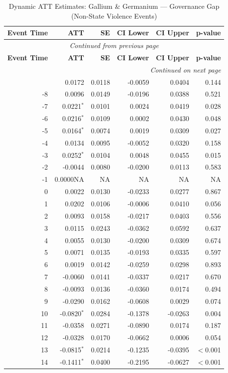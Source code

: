 \begin{longtable}{rrrrrr}
\caption{Dynamic ATT Estimates: Gallium \& Germanium --- Governance Gap (Non-State Violence Events)} \label{tab:gallium_germanium_non_state_violence_events} \\
\toprule
\textbf{Event Time} & \textbf{ATT} & \textbf{SE} & \textbf{CI Lower} & \textbf{CI Upper} & \textbf{p-value} \\
\midrule
\endfirsthead
\multicolumn{6}{c}{\textit{Continued from previous page}} \\
\toprule
\textbf{Event Time} & \textbf{ATT} & \textbf{SE} & \textbf{CI Lower} & \textbf{CI Upper} & \textbf{p-value} \\
\midrule
\endhead
\midrule \multicolumn{6}{r}{\textit{Continued on next page}} \\
\endfoot
\bottomrule
\endlastfoot
-9 & 0.0172 & 0.0118 & -0.0059 & 0.0404 & 0.144 \\
-8 & 0.0096 & 0.0149 & -0.0196 & 0.0388 & 0.521 \\
-7 & 0.0221$^{*}$ & 0.0101 & 0.0024 & 0.0419 & 0.028 \\
-6 & 0.0216$^{*}$ & 0.0109 & 0.0002 & 0.0430 & 0.048 \\
-5 & 0.0164$^{*}$ & 0.0074 & 0.0019 & 0.0309 & 0.027 \\
-4 & 0.0134 & 0.0095 & -0.0052 & 0.0320 & 0.158 \\
-3 & 0.0252$^{*}$ & 0.0104 & 0.0048 & 0.0455 & 0.015 \\
-2 & -0.0044 & 0.0080 & -0.0200 & 0.0113 & 0.583 \\
-1 & 0.0000NA & NA & NA & NA & NA \\
0 & 0.0022 & 0.0130 & -0.0233 & 0.0277 & 0.867 \\
1 & 0.0202 & 0.0106 & -0.0006 & 0.0410 & 0.056 \\
2 & 0.0093 & 0.0158 & -0.0217 & 0.0403 & 0.556 \\
3 & 0.0115 & 0.0243 & -0.0362 & 0.0592 & 0.637 \\
4 & 0.0055 & 0.0130 & -0.0200 & 0.0309 & 0.674 \\
5 & 0.0071 & 0.0135 & -0.0193 & 0.0335 & 0.597 \\
6 & 0.0019 & 0.0142 & -0.0259 & 0.0298 & 0.893 \\
7 & -0.0060 & 0.0141 & -0.0337 & 0.0217 & 0.670 \\
8 & -0.0093 & 0.0136 & -0.0360 & 0.0174 & 0.494 \\
9 & -0.0290 & 0.0162 & -0.0608 & 0.0029 & 0.074 \\
10 & -0.0820$^{*}$ & 0.0284 & -0.1378 & -0.0263 & 0.004 \\
11 & -0.0358 & 0.0271 & -0.0890 & 0.0174 & 0.187 \\
12 & -0.0328 & 0.0170 & -0.0662 & 0.0006 & 0.054 \\
13 & -0.0815$^{*}$ & 0.0214 & -0.1235 & -0.0395 & $<$0.001 \\
14 & -0.1411$^{*}$ & 0.0400 & -0.2195 & -0.0627 & $<$0.001 \\
\end{longtable}
